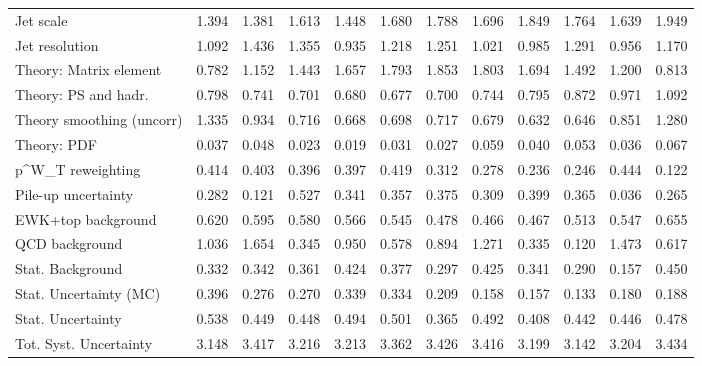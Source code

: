 \begin{tabular}{l|p{0.6cm}p{0.6cm}p{0.6cm}p{0.6cm}p{0.6cm}p{0.6cm}p{0.6cm}p{0.6cm}p{0.6cm}p{0.6cm}p{0.6cm}}
Jet scale                                & 1.394 & 1.381 & 1.613 & 1.448 & 1.680 & 1.788 & 1.696 & 1.849 & 1.764 & 1.639 & 1.949 \\
Jet resolution                           & 1.092 & 1.436 & 1.355 & 0.935 & 1.218 & 1.251 & 1.021 & 0.985 & 1.291 & 0.956 & 1.170 \\
Theory: Matrix element                   & 0.782 & 1.152 & 1.443 & 1.657 & 1.793 & 1.853 & 1.803 & 1.694 & 1.492 & 1.200 & 0.813 \\
Theory: PS and hadr.                     & 0.798 & 0.741 & 0.701 & 0.680 & 0.677 & 0.700 & 0.744 & 0.795 & 0.872 & 0.971 & 1.092 \\
Theory smoothing (uncorr)                & 1.335 & 0.934 & 0.716 & 0.668 & 0.698 & 0.717 & 0.679 & 0.632 & 0.646 & 0.851 & 1.280 \\
Theory: PDF                              & 0.037 & 0.048 & 0.023 & 0.019 & 0.031 & 0.027 & 0.059 & 0.040 & 0.053 & 0.036 & 0.067 \\
p^{W}_{T} reweighting                    & 0.414 & 0.403 & 0.396 & 0.397 & 0.419 & 0.312 & 0.278 & 0.236 & 0.246 & 0.444 & 0.122 \\
Pile-up uncertainty                      & 0.282 & 0.121 & 0.527 & 0.341 & 0.357 & 0.375 & 0.309 & 0.399 & 0.365 & 0.036 & 0.265 \\
EWK+top background                       & 0.620 & 0.595 & 0.580 & 0.566 & 0.545 & 0.478 & 0.466 & 0.467 & 0.513 & 0.547 & 0.655 \\
QCD background                           & 1.036 & 1.654 & 0.345 & 0.950 & 0.578 & 0.894 & 1.271 & 0.335 & 0.120 & 1.473 & 0.617 \\
Stat. Background                         & 0.332 & 0.342 & 0.361 & 0.424 & 0.377 & 0.297 & 0.425 & 0.341 & 0.290 & 0.157 & 0.450 \\
Stat. Uncertainty (MC)                   & 0.396 & 0.276 & 0.270 & 0.339 & 0.334 & 0.209 & 0.158 & 0.157 & 0.133 & 0.180 & 0.188 \\
\hline
Stat. Uncertainty                        & 0.538 & 0.449 & 0.448 & 0.494 & 0.501 & 0.365 & 0.492 & 0.408 & 0.442 & 0.446 & 0.478 \\
\hline
Tot. Syst. Uncertainty                   & 3.148 & 3.417 & 3.216 & 3.213 & 3.362 & 3.426 & 3.416 & 3.199 & 3.142 & 3.204 & 3.434 \\
\hline
\end{tabular}
